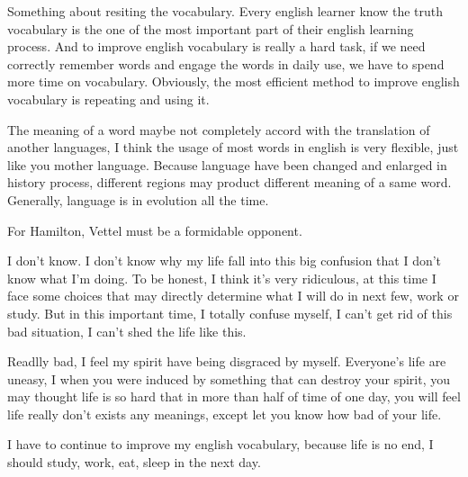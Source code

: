 \begin{writing}[18-8-31]{Something about resiting the vocabulary.}
    Every english learner know the truth vocabulary is the one of the most important part of 
    their english learning process. And to improve english vocabulary is really a 
    hard task, if we need correctly remember words and engage the words in daily use, 
    we have to spend more time on vocabulary. Obviously, the most efficient method to
    improve english vocabulary is repeating and using it.

    The meaning of a word maybe not completely accord with the translation of another languages, 
    I think the usage of most words in english is very flexible, just like you mother language.
    Because language have been changed and enlarged in history process, different regions may
    product different meaning of a same word. Generally, language is in evolution all the time.

    For Hamilton, Vettel must be a formidable opponent.
\end{writing}

\begin{writing}[18-9-4]{I don't know.}
I don't know why my life fall into this big confusion that I don't know what I'm doing.
To be honest, I think it's very ridiculous, at this time I face some choices that may
directly determine what I will do in next few, work or study. But in this important 
time, I totally confuse myself, I can't get rid of this bad situation, 
I can't shed the life like this.

Readlly bad, I feel my spirit have being disgraced by myself.
Everyone's life are uneasy, I when you were induced by something that can
destroy your spirit, you may thought life is so hard that in more than half of 
time of one day, you will feel life really don't exists any meanings, except
let you know how bad of your life.

I have to continue to improve my english vocabulary, because life is no end, I
should study, work, eat, sleep in the next day.
\end{writing}